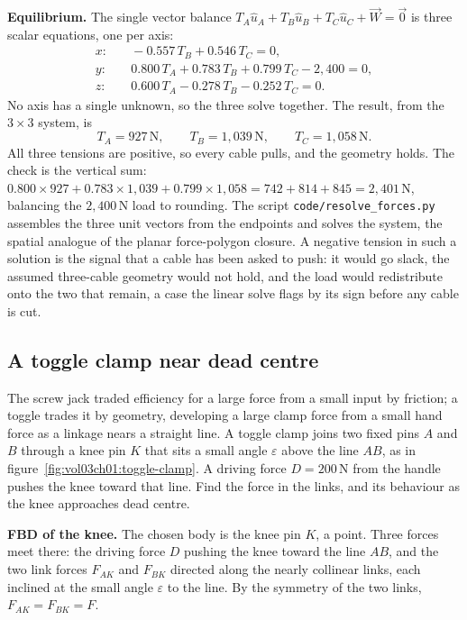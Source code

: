 \textbf{Equilibrium.} The single vector balance $T_A\hat{u}_A + T_B\hat{u}_B +
T_C\hat{u}_C + \vec{W} = \vec{0}$ is three scalar equations, one per axis:
\begin{align*}
x: &\quad -0.557\,T_B + 0.546\,T_C = 0, \\
y: &\quad 0.800\,T_A + 0.783\,T_B + 0.799\,T_C - 2{,}400 = 0, \\
z: &\quad 0.600\,T_A - 0.278\,T_B - 0.252\,T_C = 0.
\end{align*}
No axis has a single unknown, so the three solve together. The result, from the
$3\times 3$ system, is
\[
T_A = 927\,\text{N}, \qquad T_B = 1{,}039\,\text{N}, \qquad T_C = 1{,}058\,\text{N}.
\]
All three tensions are positive, so every cable pulls, and the geometry holds.
The check is the vertical sum: $0.800 \times 927 + 0.783 \times 1{,}039 + 0.799
\times 1{,}058 = 742 + 814 + 845 = 2{,}401\,\text{N}$, balancing the $2{,}400\,
\text{N}$ load to rounding. The script \texttt{code/resolve\_forces.py} assembles
the three unit vectors from the endpoints and solves the system, the spatial
analogue of the planar force-polygon closure. A negative tension in such a
solution is the signal that a cable has been asked to push: it would go slack,
the assumed three-cable geometry would not hold, and the load would redistribute
onto the two that remain, a case the linear solve flags by its sign before any
cable is cut.

\subsection{A toggle clamp near dead centre}



The screw jack traded efficiency for a large force from a small input by
friction; a toggle trades it by geometry, developing a large clamp force from a
small hand force as a linkage nears a straight line. A toggle clamp joins two
fixed pins $A$ and $B$ through a knee pin $K$ that sits a small angle
$\varepsilon$ above the line $AB$, as in
figure~\ref{fig:vol03ch01:toggle-clamp}. A driving force $D = 200\,\text{N}$
from the handle pushes the knee toward that line. Find the force in the links,
and its behaviour as the knee approaches dead centre.

\textbf{FBD of the knee.} The chosen body is the knee pin $K$, a point. Three
forces meet there: the driving force $D$ pushing the knee toward the line $AB$,
and the two link forces $F_{AK}$ and $F_{BK}$ directed along the nearly
collinear links, each inclined at the small angle $\varepsilon$ to the line. By
the symmetry of the two links, $F_{AK} = F_{BK} = F$.

